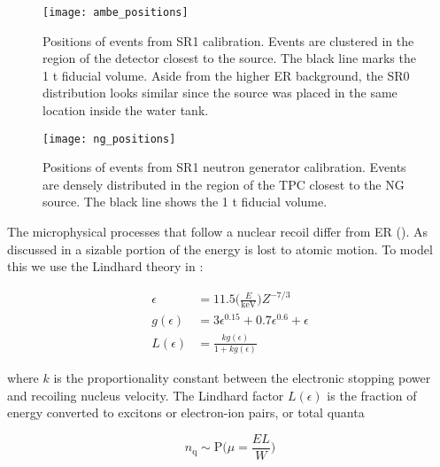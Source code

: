 \begin{figure}
\centering
\texttt{[image: ambe\_positions]}
\caption{Positions of events from SR1 \ambe calibration.  Events are clustered in the region of the detector closest to the \ambe
source.  The black line marks the 1 t fiducial volume.  Aside from the higher ER background, the SR0 distribution looks similar since the
source was placed in the same location inside the water tank.}
\label{fig:er_nr_calibrations_parameter_determ_nr_ambe_positions}
\end{figure}

\begin{figure}
\centering
\texttt{[image: ng\_positions]}
\caption{Positions of events from SR1 neutron generator calibration.  Events are densely distributed in the region of the TPC closest to
the NG source.  The black line shows the 1 t fiducial volume.}
\label{fig:er_nr_calibrations_parameter_determ_nr_ng_positions}
\end{figure}

The microphysical processes that follow a nuclear recoil differ from ER ().  As
discussed in  a sizable portion of the energy is lost to atomic motion.  To model this we use the Lindhard theory
in :

\vspace{-20pt}

\begin{subequations}
\begin{align}
\epsilon &= 11.5 \bigg( \frac{E}{\mathrm{keV}} \bigg) Z^{-7/3} \\
g( \epsilon ) &= 3 \epsilon ^{0.15} + 0.7 \epsilon ^{0.6} + \epsilon \\
L( \epsilon ) &= \frac{k g( \epsilon ) }{1 + k g( \epsilon )}
\end{align}
\label{eq:er_nr_calibrations_parameter_determ_nr_lindhard}
\end{subequations}

\vspace{-10pt}

\noindent where $k$ is the proportionality constant between the electronic stopping power and recoiling nucleus velocity.  The Lindhard
factor $L(\epsilon )$ is the fraction of energy converted to excitons or electron-ion pairs, or total quanta

\begin{equation}
n_{\mathrm{q}} \sim \mathrm{P} \bigg( \mu = \frac{E L}{W} \bigg)
\label{eq:er_nr_calibrations_parameter_determ_nr_quanta}
\end{equation}

